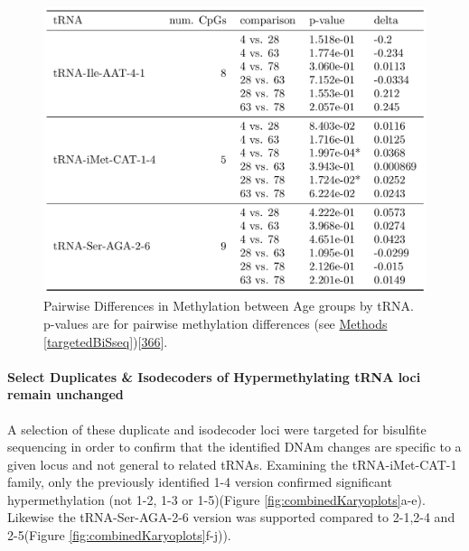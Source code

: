 \documentclass[
]{book}
\begin{document}
\begin{figure}

{\centering \includegraphics[width=1\linewidth]{./figs/pairwiseTab} 

}

\caption{Pairwise Differences in Methylation between Age groups by tRNA. p-values are for pairwise methylation differences (see \protect\hyperlink{targetedBiSseq}{Methods} \ref{targetedBiSseq}){[}\protect\hyperlink{ref-Muller2019}{366}{]}.}\label{fig:pairwiseTab}
\end{figure}



\hypertarget{select-duplicates-isodecoders-of-hypermethylating-trna-loci-remain-unchanged}{%
\paragraph{Select Duplicates \& Isodecoders of Hypermethylating tRNA loci remain unchanged}\label{select-duplicates-isodecoders-of-hypermethylating-trna-loci-remain-unchanged}}

A selection of these duplicate and isodecoder loci were targeted for bisulfite sequencing in order to confirm that the identified DNAm changes are specific to a given locus and not general to related tRNAs.
Examining the tRNA-iMet-CAT-1 family, only the previously identified 1-4 version confirmed significant hypermethylation (not 1-2, 1-3 or 1-5)(Figure \ref{fig:combinedKaryoplots}a-e). Likewise the tRNA-Ser-AGA-2-6 version was supported compared to 2-1,2-4 and 2-5(Figure \ref{fig:combinedKaryoplots}f-j)).
\end{document}
